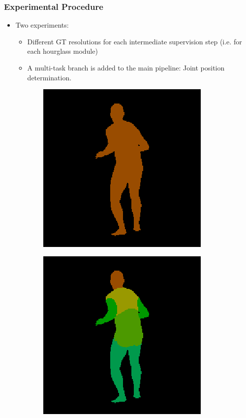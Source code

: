 \documentclass{beamer}
\begin{document}
\begin{frame}
\frametitle{Experimental Procedure}

\begin{itemize}
\item Two experiments:
\begin{itemize}
\item Different GT resolutions for each intermediate supervision step (i.e. for each hourglass module)
\item A multi-task branch is added to the main pipeline: Joint position determination.
\end{itemize}
\end{itemize}
\begin{figure}
\centering
\begin{subfigure}{.19\textwidth}
\centering
  \includegraphics[scale=0.3]{02_05_c0005_segm_80_2c.png}
\end{subfigure}
\begin{subfigure}{.19\textwidth}
  \centering
  \includegraphics[scale=0.3]{02_05_c0005_segm_80_6c.png}

\end{subfigure}
\end{figure}
\end{frame}
\end{document}
